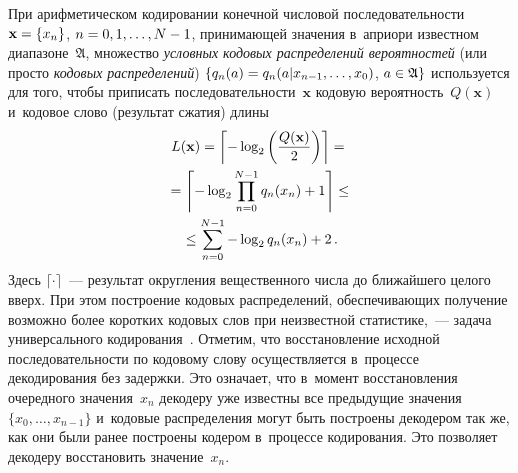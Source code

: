 \begin{multicols}{2}
При арифметическом кодировании конечной числовой последовательности $\mathbf{x}\hm=
\{x_n\}$, $n\hm= 0,1,\ldots,N-1$, принимающей значения в~априори известном диапазоне~$\mathfrak{A}$, 
множество \textit{условных кодовых распределений вероятностей} (или просто \textit{кодовых распределений})
$\{q_n(a)\hm= q_n(a\vert x_{n-1},\dots,x_0)$, $a\hm\in\mathfrak{A} \}$
используется для того, чтобы приписать последовательности~$\mathbf{x}$  кодовую 
вероятность~$Q(\mathbf{x})$ и~кодовое слово (результат сжатия) длины
\begin{multline}
\label{eq01}
L(\mathbf{x}) = \left\lceil -\log_2 \left(\displaystyle\frac{\displaystyle Q(\mathbf{x})\mathstrut}{\displaystyle 2\mathstrut}\right)  \right\rceil ={}\\
{}=
\left\lceil -\log_2 \prod\limits_{n=0}^{N-1}q_n(x_n)  + 1 \right\rceil \leq{}\\
{}\leq
\sum\limits_{n=0}^{N-1} -\log_2 q_n(x_n) + 2\,.
\end{multline}
Здесь $\lceil\cdot\rceil$~--- результат округления вещественного чис\-ла до 
ближайшего целого вверх. При этом построение кодовых распределений, 
обес\-пе\-чи\-ва\-ющих получение возможно более коротких кодовых слов при 
неизвестной статистике,~--- задача универсального кодирования~\cite{b4}. Отметим, 
что вос\-ста\-нов\-ле\-ние исходной последовательности по кодовому слову осуществляется в~процессе 
декодирования без задержки. Это означает, что в~момент восстановления очередного значения~$x_n$ 
декодеру уже известны все предыдущие значения $\{x_0,\dots,x_{n-1}\}$ и~кодовые распределения 
могут быть построены декодером так же, как они были ранее построены кодером в~процессе кодирования. 
Это позволяет декодеру восстановить значение~$x_n$. 


\end{multicols}

